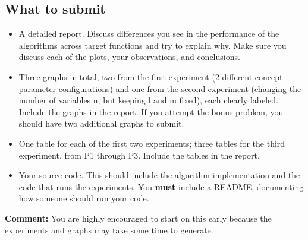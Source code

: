 \newpage
\subsection*{What to submit}
\begin{itemize}

\item A detailed report. Discuss differences you see in the
performance of the algorithms across target functions and try to
explain why. Make sure you discuss each of the plots, your
observations, and conclusions.

\item Three graphs in total, two from the first experiment (2 different concept parameter configurations) and one from the second experiment (changing the
number of variables n, but keeping l and m fixed), each clearly
labeled. Include the graphs in the report. If you attempt the bonus problem, you 
should have two additional graphs to submit.

\item One table for each of the first two experiments; three tables for the third experiment, from P1 through P3. Include the tables in the report.

\item Your source code. This should include the algorithm implementation and the code that runs the experiments. You {\bf must} include a README, documenting how someone should run your code.
\end{itemize}
{\bf Comment:} You are highly encouraged to start on this early because the
experiments and graphs may take some time to generate.


